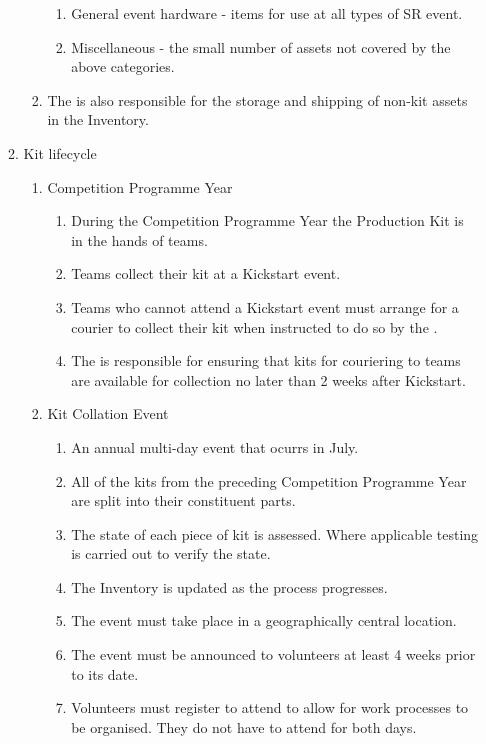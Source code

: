 \begin{enumerate}
\begin{enumerate}
\begin{enumerate}
\begin{enumerate}
          \item General event hardware - items for use at all types of SR event.
          \item Miscellaneous - the small number of assets not covered by the above categories.
        \end{enumerate}
      \item The  is also responsible for the storage and shipping of non-kit assets in the Inventory.
    \end{enumerate}
  \item Kit lifecycle
    \begin{enumerate}
      \item Competition Programme Year
        \begin{enumerate}
          \item During the Competition Programme Year the Production Kit is in the hands of teams.
          \item Teams collect their kit at a Kickstart event.
          \item Teams who cannot attend a Kickstart event must arrange for a courier to collect their kit when instructed to do so by the .
          \item The  is responsible for ensuring that kits for couriering to teams are available for collection no later than 2 weeks after Kickstart.
        \end{enumerate}
      \item Kit Collation Event
        \begin{enumerate}
          \item An annual multi-day event that ocurrs in July.
          \item All of the kits from the preceding Competition Programme Year are split into their constituent parts.
          \item The state of each piece of kit is assessed. Where applicable testing is carried out to verify the state.
          \item The Inventory is updated as the process progresses.
          \item The event must take place in a geographically central location.
          \item The event must be announced to volunteers at least 4 weeks prior to its date.
          \item Volunteers must register to attend to allow for work processes to be organised. They do not have to attend for both days.

\end{enumerate}
\end{enumerate}
\end{enumerate}
\end{enumerate}
